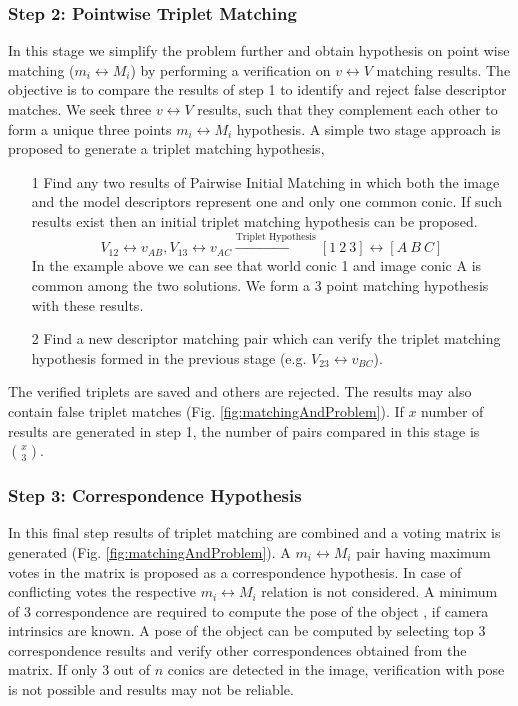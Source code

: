 \documentclass{bmvc2k}
\begin{document}
\subsubsection{Step 2: Pointwise Triplet Matching}
In this stage we simplify the problem further and obtain hypothesis on point wise matching ($ m_i \leftrightarrow M_i $) by performing a verification on $ v \leftrightarrow V $ matching results. 
The objective is to compare the results of step 1 to identify and reject false descriptor matches. 
We seek three $ v \leftrightarrow V $ results, such that they complement each other to form a unique three points $ m_i \leftrightarrow M_i $ hypothesis.
A simple two stage approach is proposed to generate a triplet matching hypothesis,
\begin{enumerate}
\item[1] Find any two results of Pairwise Initial Matching in which both the image and the model descriptors represent one and only one common conic. If such results exist then an initial triplet matching hypothesis can be proposed. 
\[
 V_{12} \leftrightarrow v_{AB},V_{13} \leftrightarrow v_{AC } \xrightarrow{\text{Triplet Hypothesis}} [1~2~3] \leftrightarrow [A~B~ C]
\]
In the example above we can see that world conic 1 and image conic A is common among the two solutions. We form a 3 point matching hypothesis with these results. 
\item[2] Find a new descriptor matching pair which can verify the triplet matching hypothesis formed in the previous stage (e.g. $ V_{23} \leftrightarrow v_{BC}$).
\end{enumerate}
The verified triplets are saved and others are rejected. 
The results may also contain false triplet matches (Fig. \ref{fig:matchingAndProblem}). 
If $ x $ number of results are generated in step 1, the number of pairs compared in this stage is $ \binom{x}{3} $. 

\subsubsection{Step 3: Correspondence Hypothesis }
\label{subSec:CHypo}
In this final step results of triplet matching are combined and a voting matrix is generated (Fig. \ref{fig:matchingAndProblem}). 
A $ m_i \leftrightarrow M_i $ pair having maximum votes in the matrix is proposed as a correspondence hypothesis. 
In case of conflicting votes the respective $ m_i \leftrightarrow M_i $ relation is not considered. 
A minimum of 3 correspondence are required to compute the pose of the object \cite{lepetit_monocular_2005}, if camera intrinsics are known. 
A pose of the object can be computed by selecting top 3 correspondence results and verify other correspondences obtained from the matrix. 
If only 3 out of $ n $ conics are detected in the image, verification with pose is not possible and results may not be reliable. 
\end{document}
